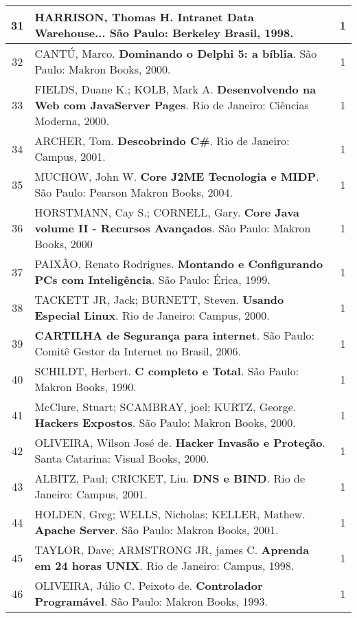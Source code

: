\begin{longtable}{|c|p{115mm}|c|}
31     & HARRISON, Thomas H. \textbf{Intranet Data Warehouse}... São Paulo: Berkeley Brasil, 1998.      & 1          \\ \hline
32     & CANTÚ, Marco. \textbf{Dominando o Delphi 5: a bíblia}. São Paulo: Makron Books, 2000.          & 1          \\ \hline
33     & FIELDS, Duane K.; KOLB, Mark A. \textbf{Desenvolvendo na Web com JavaServer Pages}. Rio de Janeiro: Ciências Moderna, 2000. & 1          \\ \hline
34     & ARCHER, Tom. \textbf{Descobrindo C\#}. Rio de Janeiro: Campus, 2001.                   & 1          \\ \hline
35     & MUCHOW, John W. \textbf{Core J2ME Tecnologia e MIDP}. São Paulo: Pearson Makron Books, 2004.   & 1          \\ \hline
36     & HORSTMANN, Cay S.; CORNELL, Gary. \textbf{Core Java volume II - Recursos Avançados}. São Paulo: Makron Books, 2000 & 1          \\ \hline
37     & PAIXÃO, Renato Rodrigues. \textbf{Montando e Configurando PCs com Inteligência}. São Paulo: Érica,  1999. & 1          \\ \hline
38     & TACKETT JR, Jack; BURNETT, Steven. \textbf{Usando Especial Linux}. Rio de Janeiro: Campus, 2000. & 1          \\ \hline
39     & \textbf{CARTILHA de Segurança para internet}. São Paulo: Comitê Gestor da Internet no Brasil, 2006. & 1          \\ \hline
40     & SCHILDT, Herbert. \textbf{C completo e Total}. São Paulo: Makron Books, 1990.                  & 1          \\ \hline
41     & McClure, Stuart; SCAMBRAY, joel; KURTZ, George. \textbf{Hackers Expostos}. São Paulo: Makron Books, 2000. & 1          \\ \hline
42     & OLIVEIRA, Wilson José de. \textbf{Hacker Invasão e Proteção}. Santa Catarina: Visual Books, 2000. & 1          \\ \hline
43     & ALBITZ, Paul; CRICKET, Liu. \textbf{DNS e BIND}. Rio de Janeiro: Campus, 2001.        & 1          \\ \hline
44     & HOLDEN, Greg; WELLS, Nicholas; KELLER, Mathew. \textbf{Apache Server}. São Paulo: Makron Books, 2001. & 1          \\ \hline
45     & TAYLOR, Dave; ARMSTRONG JR, james C. \textbf{Aprenda em 24 horas UNIX}. Rio de Janeiro: Campus, 1998. & 1          \\ \hline
46     & OLIVEIRA, Júlio C. Peixoto de. \textbf{Controlador Programável}. São Paulo: Makron Books, 1993. & 1          \\ \hline

\end{longtable}
